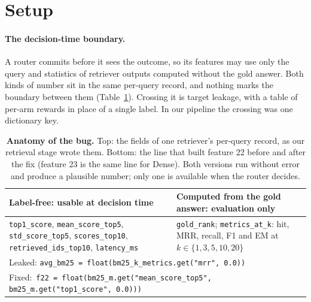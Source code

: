 \documentclass{article}
\begin{document}
\section{Setup}
\label{sec:setup}

\paragraph{The decision-time boundary.} A router commits before it sees the outcome, so its
features may use only the query and statistics of retriever outputs computed without the gold
answer. Both kinds of number sit in the same per-query record, and nothing marks the boundary
between them (Table~\ref{tab:record}). Crossing it is target leakage, with a table of per-arm
rewards in place of a single label. In our pipeline the crossing was one dictionary key.

\begin{table}[t]
\centering
\small
\caption{\textbf{Anatomy of the bug.} Top: the fields of one retriever's per-query record, as our
retrieval stage wrote them. Bottom: the line that built feature 22 before and after the fix
(feature 23 is the same line for Dense). Both versions run without error and produce a plausible
number; only one is available when the router decides.}
\label{tab:record}
\begin{tabular}{p{}p{}}
\toprule
\textbf{Label-free: usable at decision time} & \textbf{Computed from the gold answer: evaluation only} \\
\midrule
\texttt{top1\_score}, \texttt{mean\_score\_top5}, \texttt{std\_score\_top5}, \texttt{scores\_top10},
\texttt{retrieved\_ids\_top10}, \texttt{latency\_ms}
& \texttt{gold\_rank}; \texttt{metrics\_at\_k}: hit, MRR, recall, F1 and EM at $k\in\{1,3,5,10,20\}$ \\
\midrule
\multicolumn{2}{l}{\footnotesize Leaked:\; \texttt{avg\_bm25 = float(bm25\_k\_metrics.get("mrr", 0.0))}} \\
\multicolumn{2}{l}{\footnotesize Fixed:\;\;\, \texttt{f22 = float(bm25\_m.get("mean\_score\_top5", bm25\_m.get("top1\_score", 0.0)))}} \\
\bottomrule
\end{tabular}
\end{table}
\end{document}
